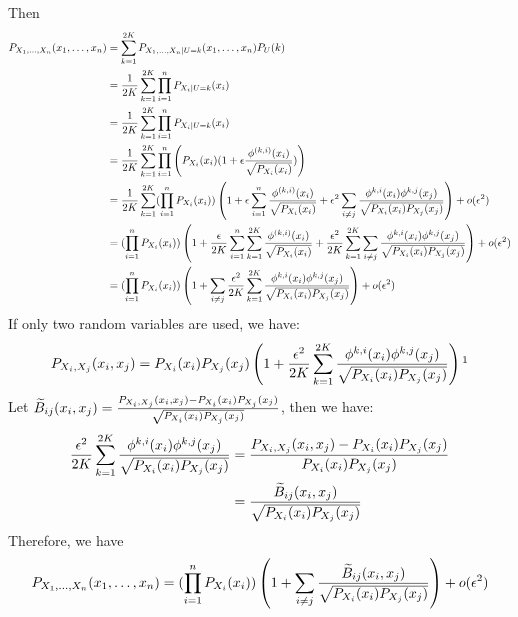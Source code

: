 \documentclass{article}
\theoremstyle{definition}
\begin{document}
Then
\begin{align*}
P_{X_1,\dots,X_n}(x_1,\dots,x_n)  &= \sum_{k=1}^{2K} P_{X_1,\dots,X_n | U=k}(x_1,\dots,x_n) P_U(k) \\
&= {1 \over 2K} \sum_{k=1}^{2K} \prod_{i=1}^n P_{X_i|U=k}(x_i)\\
&= {1 \over 2K} \sum_{k=1}^{2K} \prod_{i=1}^n P_{X_i|U=k}(x_i)\\
&= {1 \over 2K} \sum_{k=1}^{2K} \prod_{i=1}^n \left(P_{X_i} (x_i)( 1 + \epsilon {\phi^{(k,i)}(x_i ) \over \sqrt{P_{X_i}(x_i)}} )\right)\\
&= {1 \over 2K} \sum_{k=1}^{2K} (\prod_{i=1}^n  P_{X_i} (x_i))
\left( 1 + \epsilon\sum_{i=1}^n {\phi^{(k,i)}(x_i) \over \sqrt{P_{X_i}(x_i)}} + \epsilon^2\sum_{i\neq j}{\phi^{k,i}(x_i)\phi^{k,j}(x_j)\over \sqrt{P_{X_i}(x_i)P_{X_j}(x_j)} }\right)+o(\epsilon^2) \\
&= (\prod_{i=1}^n  P_{X_i} (x_i))
\left(1+{\epsilon\over 2K}\sum_{i=1}^n \sum_{k=1}^{2K}{\phi^{(k,i)}(x_i) \over \sqrt{P_{X_i}(x_i)}} +{\epsilon^2 \over 2K}\sum_{k=1}^{2K}\sum_{i\neq j}{\phi^{k,i}(x_i)\phi^{k,j}(x_j)\over \sqrt{P_{X_i}(x_i)P_{X_j}(x_j)} }\right) + o(\epsilon^2)\\
&= (\prod_{i=1}^n  P_{X_i} (x_i))
\left(1 +\sum_{i\neq j}{\epsilon^2 \over 2K}\sum_{k=1}^{2K}{\phi^{k,i}(x_i)\phi^{k,j}(x_j)\over \sqrt{P_{X_i}(x_i)P_{X_j}(x_j)} }\right) + o(\epsilon^2)
\end{align*}
If only two random variables are used, we have:
$$P_{X_i, X_j}(x_i, x_j) = P_{X_i}(x_i)P_{X_j}(x_j)\left(1+{\epsilon^2 \over 2K} \sum_{k=1}^{2K}{\phi^{k,i}(x_i)\phi^{k,j}(x_j)\over \sqrt{P_{X_i}(x_i)P_{X_j}(x_j)} } \right) \footnotemark$$
Let $\widetilde{B}_{ij}(x_i, x_j)={P_{X_i, X_j}(x_i,x_j) - P_{X_i}(x_i)P_{X_j}(x_j) \over \sqrt{P_{X_i}(x_i)P_{X_j}(x_j)}} $, then we have:
\begin{align*}
{\epsilon^2 \over 2K} \sum_{k=1}^{2K}{\phi^{k,i}(x_i)\phi^{k,j}(x_j)\over \sqrt{P_{X_i}(x_i)P_{X_j}(x_j)} } & = {P_{X_i, X_j}(x_i, x_j) - P_{X_i}(x_i)P_{X_j}(x_j) \over P_{X_i}(x_i)P_{X_j}(x_j)} \\
& = {\widetilde{B}_{ij}(x_i, x_j) \over \sqrt{P_{X_i}(x_i)P_{X_j}(x_j)} }
\end{align*}
Therefore, we have 
\begin{equation}
P_{X_1,\dots,X_n}(x_1,\dots,x_n) =  (\prod_{i=1}^n  P_{X_i} (x_i))\left ( 1 + \sum_{i\neq j}{\widetilde{B}_{ij}(x_i, x_j) \over \sqrt{P_{X_i}(x_i)P_{X_j}(x_j)} }\right) +o(\epsilon^2)
\end{equation}
\end{document}
